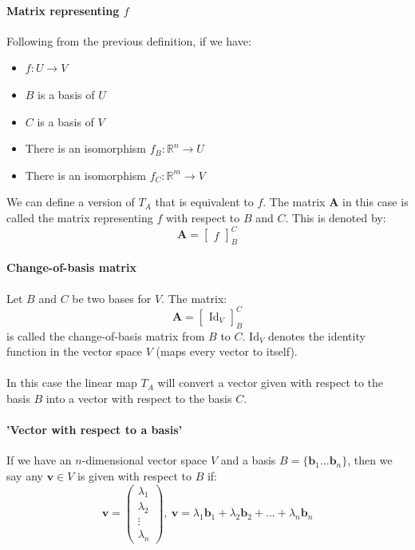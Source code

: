 \documentclass{scrartcl}
\newcommand{\R}{\mathbb{R}}
\renewcommand{\vec}[1]{\mathbf{#1}}
\begin{document}
\paragraph{Matrix representing $ f $}
Following from the previous definition, if we have:
\begin{itemize}
\item $ f : U \to V $
\item $ B $ is a basis of $ U $
\item $ C $ is a basis of $ V $
\item There is an isomorphism $ f_{B} : \R^{n} \to U $
\item There is an isomorphism $ f_{C} : \R^{m} \to V $
\end{itemize}
We can define a version of $ T_{A} $ that is equivalent to $ f $. The matrix $ \vec{A} $ in this case is called the matrix representing $ f $ with respect to $ B $ and $ C $. This is denoted by:
\begin{equation}
\vec{A} =
\begin{bmatrix}
f
\end{bmatrix}_{B}^{C}
\end{equation}

\paragraph{Change-of-basis matrix}
Let $ B $ and $ C $ be two bases for $ V $. The matrix:
\begin{equation}
\vec{A} =
\begin{bmatrix}
\textrm{Id}_{V}
\end{bmatrix}_{B}^{C}
\end{equation}
is called the change-of-basis matrix from $ B $ to $ C $. $ \textrm{Id}_{V} $ denotes the identity function in the vector space $ V $ (maps every vector to itself).
\\\\
In this case the linear map $ T_{A} $ will convert a vector given with respect to the basis $ B $ into a vector with respect to the basis $ C $.

\paragraph{'Vector with respect to a basis'}
If we have an $ n $-dimensional vector space $ V $ and a basis $ B = \{\vec{b}_{1} ... \vec{b}_{n} \} $, then we say any $ \vec{v} \in V $  is given with respect to $ B $ if:
\begin{equation}
\vec{v} = 
\begin{pmatrix}
\lambda_{1} \\ \lambda_{2} \\ \vdots \\ \lambda_{n}
\end{pmatrix} , \ 
\vec{v} = \lambda_{1}\vec{b}_{1} + \lambda_{2}\vec{b}_{2} + ... + \lambda_{n}\vec{b}_{n}
\end{equation}
\end{document}
